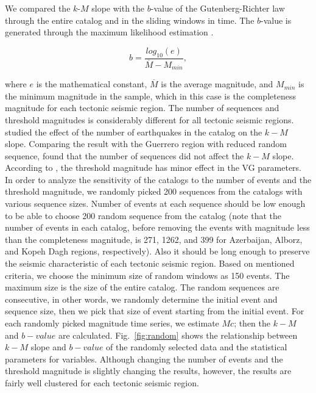 We compared the  $k$-$M$  slope with the  $b$-value  of the Gutenberg-Richter law through the entire catalog and in the sliding windows in time. The $b$-value is generated through the maximum likelihood estimation \citep{Aki1965}.

\begin{equation}
	b = \frac{log_{10}(e) }{\overline{M} - M_{min}},
\end{equation}

\noindent
where $e$ is the mathematical constant, $\overline{M}$ is the average magnitude, and  $M_ {min}$ is the minimum magnitude in the sample, which in this case is the completeness magnitude for each tectonic seismic region. The number of sequences and threshold magnitudes is considerably different for all tectonic seismic regions.  \citet{Telesca2013}  studied the effect of the number of earthquakes in the catalog on the  $k-M$  slope. Comparing the result with the Guerrero region with reduced random sequence,  \citet{Telesca2013}  found that the number of sequences did not affect the  $k-M$  slope.  According to  \citet{Telesca2012}, the threshold magnitude has minor effect in the VG parameters.\\

In order to analyze the sensitivity of the catalogs to the number of events and the threshold magnitude, we randomly picked 200 sequences from the catalogs with various sequence sizes. Number of events at each sequence should be low enough to be able to choose 200 random sequence from the catalog (note that the number of events in each catalog, before removing the events with magnitude less than the completeness magnitude, is 271, 1262, and 399 for Azerbaijan, Alborz, and Kopeh Dagh regions, respectively). Also it should be long enough to preserve the seismic characteristic of each tectonic seismic region. Based on mentioned criteria, we choose the minimum size of random windows as 150 events. The maximum size is the size of the entire catalog. The random sequences are consecutive, in other words, we randomly determine the initial event and sequence size, then we pick that size of event starting from the initial event. For each randomly picked magnitude time series,  we estimate $Mc$; then the $k-M$  and $b-value$ are calculated. Fig.~\ref{fig:random} shows the relationship between  $k-M$  slope and  $b-value$  of the randomly selected data and the statistical parameters for variables. Although changing the number of events and the threshold magnitude is slightly changing the results, however,  the results are fairly well clustered for each tectonic seismic region. 
   
